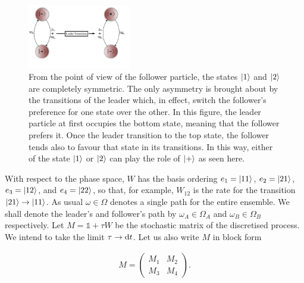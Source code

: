 \begin{figure}
\centering
\includegraphics[width = 0.4\textwidth]{figures/follower_pov.png}
\caption{\footnotesize From the point of view of the follower particle, the states $\ket{1}$ and $\ket{2}$ are completely symmetric. The only asymmetry is brought about by the transitions of the leader which, in effect, switch the follower's preference for one state over the other. In this figure, the leader particle at first occupies the bottom state, meaning that the follower prefers it. Once the leader transition to the top state, the follower tends also to favour that state in its transitions. In this way, either of the state $\ket{1}$ or $\ket{2}$ can play the role of $\ket{+}$ as seen here.}
\label{follower-pov}
\end{figure}

With respect to the phase space, $W$ has the basis ordering $e_1 = \ket{11}$, $e_2 = \ket{21}$, $e_3 = \ket{12}$, and $e_4 = \ket{22}$, so that, for example, $W_{12}$ is the rate for the transition $\ket{21} \rightarrow \ket{11}$. As usual $\omega \in \Omega$ denotes a single path for the entire ensemble. We shall denote the leader's and follower's path by $\omega_A \in \Omega_A$ and $\omega_B \in \Omega_B$ respectively. Let $M = \mathds{1} + \tau W$ be the stochastic matrix of the discretised process. We intend to take the limit $\tau \rightarrow \mathrm{d} t$. Let us also write $M$ in block form 

\begin{align}
M = \begin{pmatrix} M_1 & M_2 \\ 
M_3 & M_4\end{pmatrix}.
\end{align}


